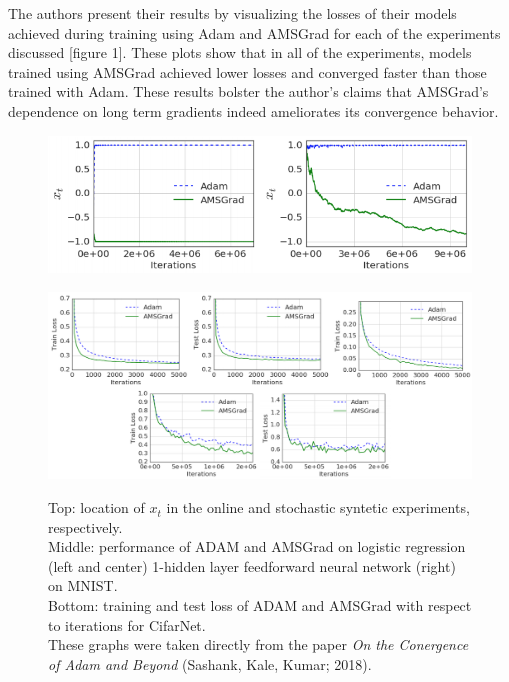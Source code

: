 \documentclass[letterpaper, 10 pt, conference]{ieeeconf}  %
\begin{document}
The authors present their results by visualizing the losses of their models achieved during training using Adam and AMSGrad for each of the experiments discussed [figure 1]. These plots show that in all of the experiments, models trained using AMSGrad achieved lower losses and converged faster than those trained with Adam. These results bolster the author's claims that AMSGrad's dependence on long term gradients indeed ameliorates its convergence behavior.
\begin{figure}
\begin{minipage}{1\textwidth}
\centering
\begin{minipage}{0.55\textwidth}
  \centering
  \includegraphics[width=1\linewidth]{OG_synthetic.png}
  \label{fig:test2}
\end{minipage}%
\centering
\break
\begin{minipage}{0.9\textwidth}
  \centering
  \includegraphics[width=1\linewidth]{OG_results_nets.png}
  \label{fig:test2}
\end{minipage}%
\end{minipage}
\caption[]{Top: location of $x_t$ in the online and stochastic syntetic experiments, respectively. \\
Middle: performance of ADAM and AMSGrad on logistic regression (left and center) 1-hidden layer feedforward neural network (right) on MNIST.\\
Bottom: training and test loss of ADAM and AMSGrad with respect to iterations for CifarNet.\\
These graphs were taken directly from the paper \emph{On the Conergence of Adam and Beyond} (Sashank, Kale, Kumar; 2018).} 
\end{figure}    
   
\end{document}
